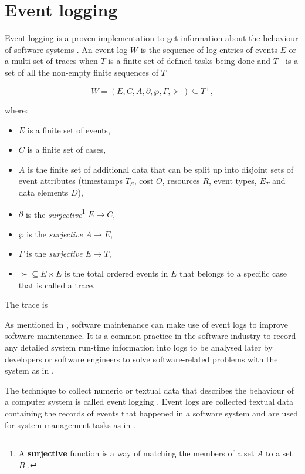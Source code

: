 \clearpage

\section{Event logging}\label{sec:ch1_eventLogging}
Event logging is a proven implementation to get information about the behaviour of software systems \cite{Baccanico2014}.
An event log $W$ is the sequence of log entries of events $E$ or a multi-set of traces when $T$ is a finite set of defined tasks being done and $T^+$ is a set of all the non-empty finite sequences of $T$ \cite{Kherbouche2017}

\begin{equation}
	\label{eq:LogEvent}
	W = (E, C, A, \partial, \wp, \Gamma, \succ) \subseteq T^+,
\end{equation}

where:

\begin{itemize}
	\item $E$ is a finite set of events,
	\item $C$ is a finite set of cases,
	\item $A$ is the finite set of additional data that can be split up into disjoint sets of event attributes (timestamps $T_S$, cost $O$, resources $R$, event types, $E_T$ and data elements $D$),
	\item $\partial$ is the \textit{surjective}\footnote{\label{ftn:Surjective}A \textbf{surjective} function is a way of matching the members of a set $A$ to a set $B$ \cite{Szendrei1990}.} $E\rightarrow C$,
	\item $\wp$ is the \textit{surjective} $A\rightarrow E$,
	\item $\Gamma$ is the \textit{surjective} $E\rightarrow T$,
	\item $\succ \subseteq E\times E$ is the total ordered events in $E$ that belongs to a specific case that is called a trace.
\end{itemize}

The trace is 

As mentioned in , software maintenance can make use of event logs to improve software maintenance. It is a common practice in the software industry to record any detailed system run-time information into logs to be analysed later by developers or software engineers to solve software-related problems with the system as in  \cite{Zhu2019}.\par The technique to collect numeric or textual data that describes the behaviour of a computer system is called event logging \cite{Pecchia2015, Baccanico2014}. Event logs are collected textual data containing the records of events that happened in a software system and are used for system management tasks as in  \cite{Rong2018a, Rong2018, Baccanico2014}.

